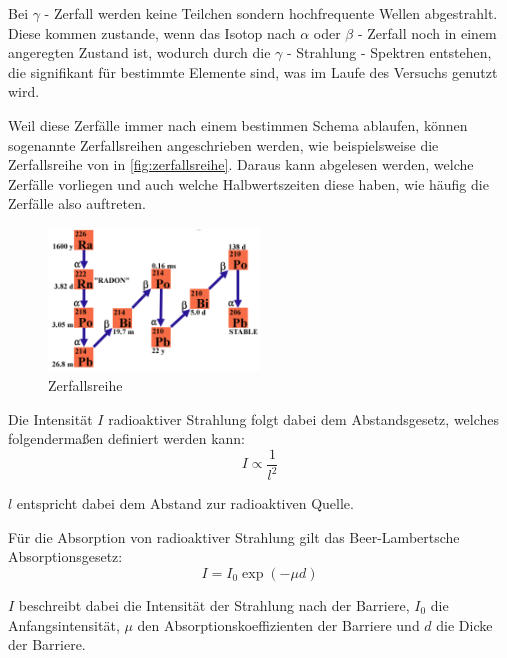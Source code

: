 \documentclass[12pt,english,ngerman]{scrartcl}
\begin{document}
Bei \(\gamma\) - Zerfall werden keine Teilchen sondern hochfrequente Wellen
abgestrahlt. Diese kommen zustande, wenn das Isotop nach \(\alpha\) oder
\(\beta\) - Zerfall noch in einem angeregten Zustand ist, wodurch durch die
\(\gamma\) - Strahlung - Spektren entstehen, die signifikant für bestimmte
Elemente sind, was im Laufe des Versuchs genutzt wird.

Weil diese Zerfälle immer nach einem bestimmen Schema ablaufen, können
sogenannte Zerfallsreihen angeschrieben werden, wie beispielsweise die
Zerfallsreihe von  in \autoref{fig:zerfallsreihe}. Daraus
kann abgelesen werden, welche Zerfälle vorliegen und auch welche
Halbwertszeiten diese haben, wie häufig die Zerfälle also auftreten.

\begin{figure}[H]
	\begin{center}
		\includegraphics[width = 0.5\textwidth]{./figures/zerfallsreihe.png}
	\end{center}
	\caption{Zerfallsreihe ~\cite{zerfallsreihera226}}\label{fig:zerfallsreihe}
\end{figure}

Die Intensität \(I\) radioaktiver Strahlung folgt dabei dem Abstandsgesetz,
welches folgendermaßen definiert werden kann:
\begin{equation}
	I \propto \frac{1}{l^2}
	\label{eq:abstandsgesetz}
\end{equation}

\(l\) entspricht dabei dem Abstand zur radioaktiven Quelle.

Für die Absorption von radioaktiver Strahlung gilt das Beer-Lambertsche
Absorptionsgesetz:
\begin{equation}
	I = I_0 \exp(-\mu d)
	\label{eq:beerschesgesetzt}
\end{equation}

\(I\) beschreibt dabei die Intensität der Strahlung nach der Barriere, \(I_0\)
die Anfangsintensität, \(\mu\) den Absorptionskoeffizienten der Barriere und
\(d\) die Dicke der Barriere.
\end{document}
